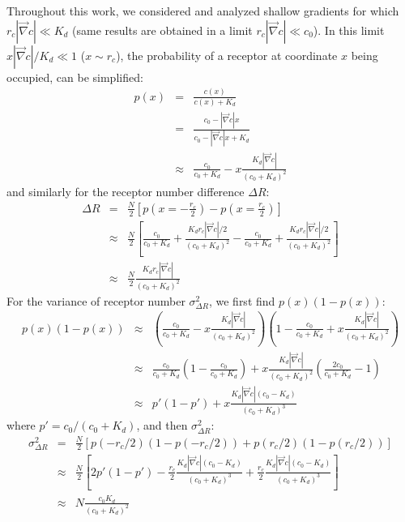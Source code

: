 \documentclass[10pt]{article}
\begin{document}
Throughout this work, we considered and analyzed shallow gradients for which $r_c |\vec{\nabla}c| \ll K_d$ (same results are obtained in a limit $r_c |\vec{\nabla}c| \ll c_0$). In this limit $x|\vec{\nabla}c|/K_d \ll 1$ ($x \sim r_c$), the probability of a receptor at coordinate $x$ being occupied, can be simplified:
\begin{eqnarray}
	p(x) & = & \frac{c(x)}{c(x) + K_d} \\
	     & = & \frac{c_0 - |\vec{\nabla}c|x}{c_0 - |\vec{\nabla}c|x + K_d} \\
			 & \approx & \frac{c_0}{c_0 + K_d} - x \frac{K_d |\vec{\nabla}c|}{(c_0 + K_d)^2}
\end{eqnarray}
and similarly for the receptor number difference $\Delta R$:
\begin{eqnarray}
	\Delta R & = & \frac{N}{2}\left[p\left(x=-\frac{r_c}{2}\right) - p\left(x=\frac{r_c}{2}\right)\right] \\
					 & \approx & \frac{N}{2}\left[\frac{c_0}{c_0 + K_d} + \frac{K_d r_c|\vec{\nabla}c|/2}{(c_0 + K_d)^2} - 
																			  \frac{c_0}{c_0 + K_d} + \frac{K_d r_c|\vec{\nabla}c|/2}{(c_0 + K_d)^2}\right]	\\
					 & \approx & \frac{N}{2}\frac{K_d r_c|\vec{\nabla}c|}{(c_0 + K_d)^2}
\end{eqnarray}
For the variance of receptor number $\sigma_{\Delta R}^2$, we first find $p(x)(1-p(x))$:
\begin{eqnarray}
	p(x)(1-p(x)) & \approx & \left(\frac{c_0}{c_0 + K_d} - x \frac{K_d |\vec{\nabla}c|}{(c_0 + K_d)^2}\right)\left( 1 - \frac{c_0}{c_0 + K_d} + x \frac{K_d |\vec{\nabla}c|}{(c_0 + K_d)^2}\right) \\
						   & \approx & \frac{c_0}{c_0 + K_d}\left(1 - \frac{c_0}{c_0 + K_d}\right) + x \frac{K_d |\vec{\nabla}c|}{(c_0 + K_d)^2} \left(\frac{2 c_0}{c_0 + K_d} - 1\right) \\
							 & \approx & p'(1-p') + x \frac{K_d |\vec{\nabla}c| (c_0 - K_d)}{(c_0 + K_d)^3}
\end{eqnarray}
where $p' = c_0/(c_0 + K_d)$, and then $\sigma_{\Delta R}^2$:
\begin{eqnarray}
	\sigma_{\Delta R}^2 & = & \frac{N}{2}\left[p(-r_c/2)\left(1 - p(-r_c/2)\right) + 
																						 p(r_c/2)\left(1 - p(r_c/2)\right) \right] \\
											& \approx & \frac{N}{2}\left[2p'(1-p') - 
												\frac{r_c}{2} \frac{K_d |\vec{\nabla}c| (c_0 - K_d)}{(c_0 + K_d)^3} + 
												\frac{r_c}{2} \frac{K_d |\vec{\nabla}c| (c_0 - K_d)}{(c_0 + K_d)^3}\right] \\
											& \approx & N \frac{c_0 K_d}{(c_0 + K_d)^2}
\end{eqnarray}
\end{document}
